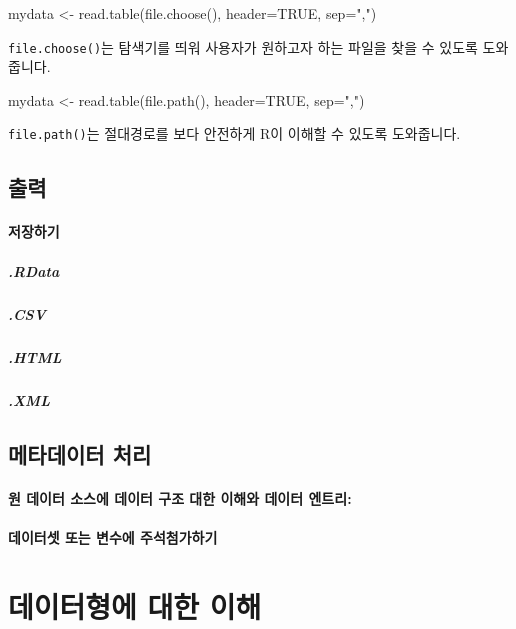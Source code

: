 \documentclass{report}
\begin{document}
\begin{Schunk}
\begin{Soutput}
mydata <- read.table(file.choose(), header=TRUE, sep=",")
\end{Soutput}
\end{Schunk}

\texttt{file.choose()}는 탐색기를 띄워 사용자가 원하고자 하는 파일을 찾을 수 있도록 도와줍니다. 

\begin{Schunk}
\begin{Soutput}
mydata <- read.table(file.path(), header=TRUE, sep=",")
\end{Soutput}
\end{Schunk}

\texttt{file.path()}는 절대경로를 보다 안전하게 R이 이해할 수 있도록 도와줍니다. 





\subsection{출력}


% 
\paragraph{저장하기}
\subparagraph{.RData}
\subparagraph{.CSV}
\subparagraph{.HTML}
\subparagraph{.XML}

\subsection{메타데이터 처리}
\paragraph{원 데이터 소스에 데이터 구조 대한 이해와 데이터 엔트리: }

\paragraph{데이터셋 또는 변수에 주석첨가하기}


\section{데이터형에 대한 이해}
\end{document}
